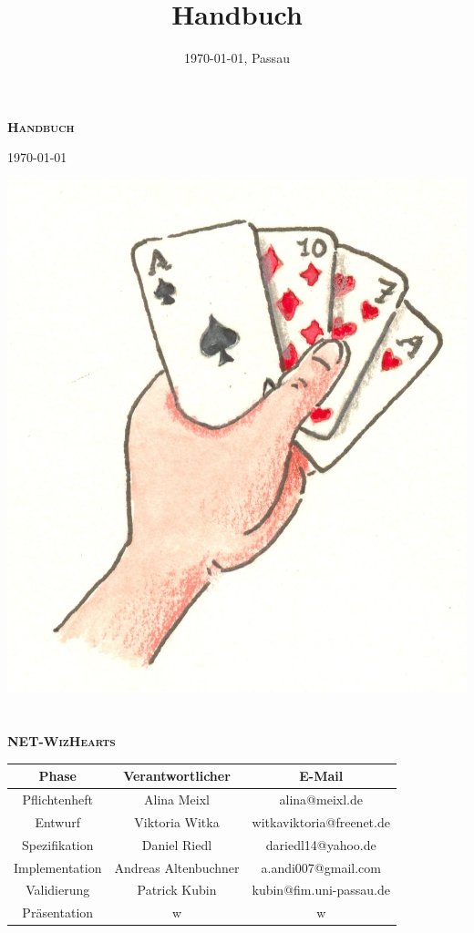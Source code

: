 \documentclass[titlepage,10pt,a4paper]{article}
\title{Handbuch}
\date{\today{}, Passau}
\begin{document}
\begin{titlepage}
\vspace*{3cm}
\begin{center}
\textbf{\textsc{\LARGE Handbuch}}

{\large \today}

\vspace{2cm}
\includegraphics{kartenspiel}
\ \\
\ \\

\textbf{\textsc{\LARGE NET-WizHearts}}
\vspace{2cm}

\begin{tabular}{|c|c|c|}\hline
   Phase & Verantwortlicher & E-Mail \\ \hline\hline
   Pflichtenheft & Alina Meixl &  alina@meixl.de \\ \hline
   Entwurf & Viktoria Witka & witkaviktoria@freenet.de \\ \hline
   Spezifikation & Daniel Riedl & dariedl14@yahoo.de \\ \hline
   Implementation & Andreas Altenbuchner& a.andi007@gmail.com\\ \hline
   Validierung & Patrick Kubin & kubin@fim.uni-passau.de\\ \hline
   Präsentation & w& w\\ \hline
 \end{tabular}
\vspace{2cm}
\\
\end{center}
\end{titlepage}
\tableofcontents
{}
\hypersetup{pageanchor=true}
\end{document}
